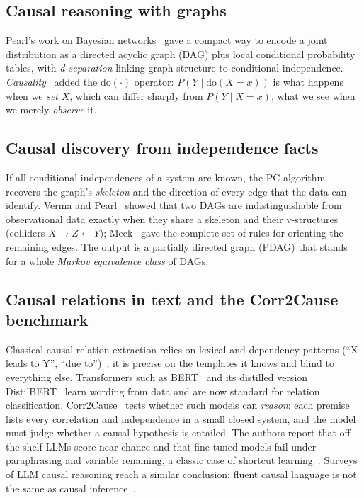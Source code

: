 \documentclass[12pt,a4paper]{article}
\newcommand{\doop}{\mathrm{do}}
\begin{document}
\subsection{Causal reasoning with graphs}
Pearl's work on Bayesian networks~\cite{pearl1988} gave a compact way to encode a joint distribution as a
directed acyclic graph (DAG) plus local conditional probability tables, with \emph{d-separation} linking graph
structure to conditional independence. \emph{Causality}~\cite{pearl2009} added the $\doop(\cdot)$ operator:
$P(Y \mid \doop(X{=}x))$ is what happens when we \emph{set} $X$, which can differ sharply from
$P(Y \mid X{=}x)$, what we see when we merely \emph{observe} it.

\subsection{Causal discovery from independence facts}
If all conditional independences of a system are known, the PC algorithm~\cite{spirtes2000} recovers the
graph's \emph{skeleton} and the direction of every edge that the data can identify. Verma and
Pearl~\cite{verma1990} showed that two DAGs are indistinguishable from observational data exactly when they
share a skeleton and their v-structures (colliders $X\!\rightarrow\!Z\!\leftarrow\!Y$); Meek~\cite{meek1995}
gave the complete set of rules for orienting the remaining edges. The output is a partially directed graph
(PDAG) that stands for a whole \emph{Markov equivalence class} of DAGs.

\subsection{Causal relations in text and the Corr2Cause benchmark}
Classical causal relation extraction relies on lexical and dependency patterns (``X leads to Y'', ``due to'')~\cite{khoo2000,girju2003};
it is precise on the templates it knows and blind to everything else. Transformers such as BERT~\cite{devlin2019}
and its distilled version DistilBERT~\cite{sanh2019} learn wording from data and are now standard for relation
classification. Corr2Cause~\cite{jin2024corr2cause} tests whether such models can \emph{reason}: each premise lists
every correlation and independence in a small closed system, and the model must judge whether a causal hypothesis
is entailed. The authors report that off-the-shelf LLMs score near chance and that fine-tuned models fail under
paraphrasing and variable renaming, a classic case of shortcut learning~\cite{gururangan2018,geirhos2020}.
Surveys of LLM causal reasoning reach a similar conclusion: fluent causal language is not the same as causal
inference~\cite{kiciman2023}.
\end{document}
